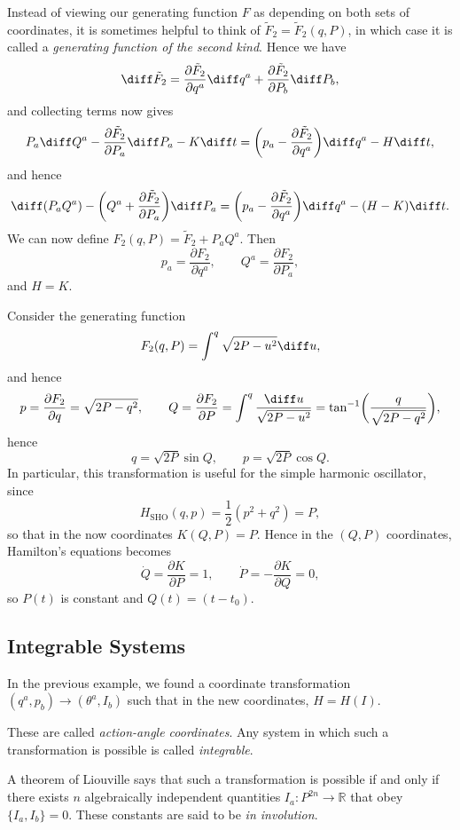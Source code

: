 \documentclass[12pt]{article}
\begin{document}
Instead of viewing our generating function $F$ as depending on both sets of coordinates, it is sometimes helpful to think of $\tilde F_2 = \tilde F_2(q, P)$, in which case it is called a \emph{generating function of the second kind}. Hence we have
\[
\diff \tilde F_2 = \frac{\partial \tilde F_2}{\partial q^a} \diff q^a + \frac{\partial \tilde F_2}{\partial P_b} \diff P_b,
\]
and collecting terms now gives
\[
P_a \diff Q^a - \frac{\partial \tilde F_2}{\partial P_a} \diff P_a - K \diff t = \biggl( p_a - \frac{\partial \tilde F_2}{\partial q^a} \biggr) \diff q^a - H \diff t,
\]
and hence
\[
\diff (P_a Q^a) - \biggl( Q^a + \frac{\partial \tilde F_2}{\partial P_a} \biggr) \diff P_a = \biggl( p_a - \frac{\partial \tilde F_2}{\partial q^a} \biggr) \diff q^a - (H-K) \diff t.
\]
We can now define $F_2(q,P) = \tilde F_2 + P_aQ^a$. Then
\[
p_a = \frac{\partial F_2}{\partial q^a}, \qquad Q^a = \frac{\partial F_2}{\partial P_a},
\]
and $H = K$.
\begin{exbox}
	Consider the generating function
	\[
		F_2(q,P) = \int^q\sqrt{2P - u^2}\diff u,
	\]
	and hence
	\[
		p = \frac{\partial F_2}{\partial q} = \sqrt{2P - q^2}, \qquad Q = \frac{\partial F_2}{\partial P} = \int^q \frac{\diff u}{\sqrt{2P - u^2}} = \tan^{-1} \biggl( \frac{q}{\sqrt{2P - q^2}} \biggr),
	\]
	hence
	\[
		q = \sqrt{2P} \sin Q, \qquad p =\sqrt{2P} \cos Q.
	\]
	In particular, this transformation is useful for the simple harmonic oscillator, since
	\[
	H_{\mathrm{SHO}}(q, p) = \frac{1}{2}(p^2 + q^2) = P,
	\]
	so that in the now coordinates $K(Q,P) = P$. Hence in the $(Q,P)$ coordinates, Hamilton's equations becomes
	\[
	\dot Q = \frac{\partial K}{\partial P} = 1, \qquad \dot P = - \frac{\partial K}{\partial Q} = 0,
	\]
	so $P(t)$ is constant and $Q(t) = (t - t_0)$.
\end{exbox}

\subsection{Integrable Systems}
\label{sub:int_sys}

In the previous example, we found a coordinate transformation $(q^a, p_b) \to (\theta^a, I_b)$ such that in the new coordinates, $H = H(I)$.

These are called \emph{action-angle coordinates}. Any system in which such a transformation is possible is called \emph{integrable}.

A theorem of Liouville says that such a transformation is possible if and only if there exists $n$ algebraically independent quantities $I_a : P^{2n} \to \mathbb{R}$ that obey $\{I_a, I_b\} = 0$. These constants are said to be \emph{in involution}.
\end{document}
